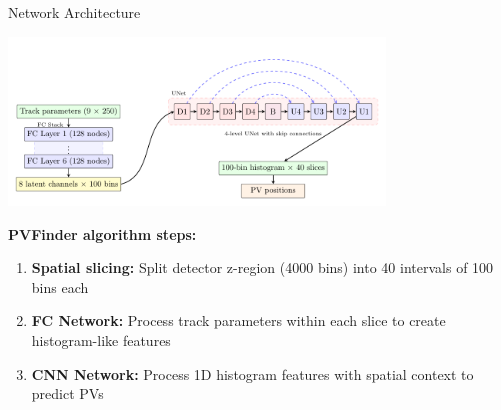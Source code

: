 \documentclass[10pt,aspectratio=169]{beamer}
\begin{document}
\begin{frame}{Network Architecture}
  \begin{center}
\includegraphics[width=0.75\textwidth]{figures/pvfinder-diagram-compact.pdf}  
  \end{center}

  \textbf{PVFinder algorithm steps:} 
  \begin{enumerate}
    \item \textbf{Spatial slicing:} Split detector z-region (4000 bins) into 40 intervals of 100 bins each
    \item \textbf{FC Network:} Process track parameters within each slice to create histogram-like features
    \item \textbf{CNN Network:} Process 1D histogram features with spatial context to predict PVs
  \end{enumerate}
\end{frame}
\end{document}
